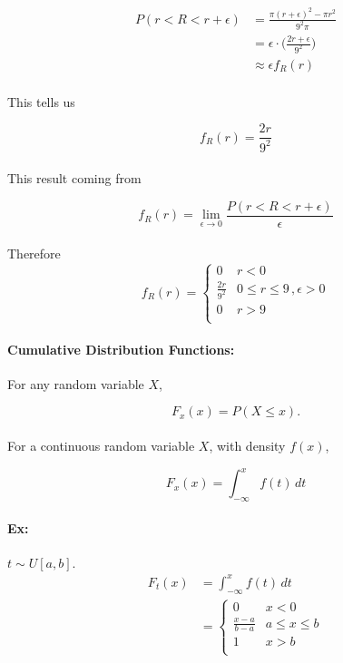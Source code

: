 \documentclass{article}
\begin{document}
    \begin{align*}
        P(r < R < r + \epsilon) &= \frac{\pi (r+\epsilon)^2 - \pi r^2}{9^2\pi}\\
                                &= \epsilon \cdot \bigg(\frac{2r + \epsilon}{9^2}\bigg)\\
                                &\approx \epsilon f_R(r)
    \end{align*}
    \paragraph{}This tells us
    
    \[
        f_R(r)=\frac{2r}{9^2}
    \]
    \paragraph{}This result coming from 
    
    \[
        f_R(r) = \lim_{\epsilon\to0} \frac{P(r < R < r+\epsilon)}{\epsilon}
    \]
    \paragraph{}Therefore
    \[ f_R(r) = \begin{cases}
        0 & r < 0 \\
        \frac{2r}{9^2} & 0 \le r \le 9\, , \epsilon > 0 \\
        0 & r > 9 \\
        \end{cases}
    \]

    \paragraph{Cumulative Distribution Functions:} For any random variable $X$,
    
    \[
        F_x(x) = P(X \le x).
    \]

    \paragraph{}For a continuous random variable $X$, with density $f(x)$,
    
    \[
        F_x(x) = \int_{-\infty}^{x}f(t)\, dt
    \]
    \paragraph{Ex:} $t \sim U[a,b]$.
    \begin{align*}
        F_t(x)&= \int_{-\infty}^{x}f(t)\,dt\\
              &= \begin{cases}
                    0 & x < 0 \\
                    \frac{x-a}{b-a} & a\le x \le b \\
                    1 & x > b\\
                    \end{cases}
    \end{align*}
\end{document}
